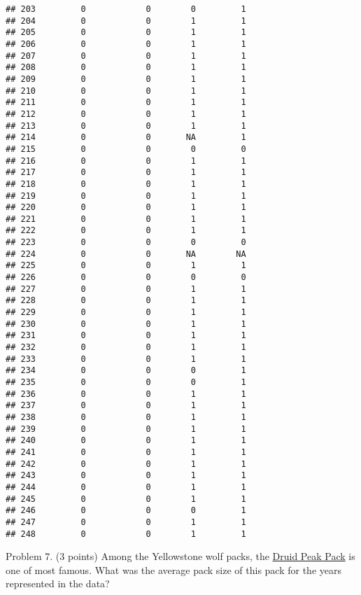 \documentclass[
]{article}
\begin{document}
\begin{verbatim}
## 203         0            0        0         1
## 204         0            0        1         1
## 205         0            0        1         1
## 206         0            0        1         1
## 207         0            0        1         1
## 208         0            0        1         1
## 209         0            0        1         1
## 210         0            0        1         1
## 211         0            0        1         1
## 212         0            0        1         1
## 213         0            0        1         1
## 214         0            0       NA         1
## 215         0            0        0         0
## 216         0            0        1         1
## 217         0            0        1         1
## 218         0            0        1         1
## 219         0            0        1         1
## 220         0            0        1         1
## 221         0            0        1         1
## 222         0            0        1         1
## 223         0            0        0         0
## 224         0            0       NA        NA
## 225         0            0        1         1
## 226         0            0        0         0
## 227         0            0        1         1
## 228         0            0        1         1
## 229         0            0        1         1
## 230         0            0        1         1
## 231         0            0        1         1
## 232         0            0        1         1
## 233         0            0        1         1
## 234         0            0        0         1
## 235         0            0        0         1
## 236         0            0        1         1
## 237         0            0        1         1
## 238         0            0        1         1
## 239         0            0        1         1
## 240         0            0        1         1
## 241         0            0        1         1
## 242         0            0        1         1
## 243         0            0        1         1
## 244         0            0        1         1
## 245         0            0        1         1
## 246         0            0        0         1
## 247         0            0        1         1
## 248         0            0        1         1
\end{verbatim}

Problem 7. (3 points) Among the Yellowstone wolf packs, the
\href{https://www.pbs.org/wnet/nature/in-the-valley-of-the-wolves-the-druid-wolf-pack-story/209/}{Druid
Peak Pack} is one of most famous. What was the average pack size of this
pack for the years represented in the data?
\end{document}
